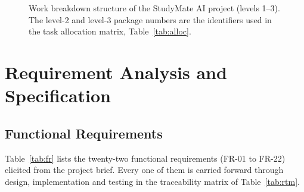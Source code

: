 \documentclass[12pt,a4paper,oneside]{report}
\begin{document}
\begin{landscape}
\begin{figure}[H]
\caption{Work breakdown structure of the StudyMate AI project (levels 1--3). The
level-2 and level-3 package numbers are the identifiers used in the task allocation
matrix, Table~\ref{tab:alloc}.}
\label{fig:wbs}
\end{figure}
\end{landscape}

\chapter{Requirement Analysis and Specification}\label{ch:req}

\section{Functional Requirements}

Table~\ref{tab:fr} lists the twenty-two functional requirements (FR-01 to FR-22) elicited from the project brief. Every one of them is carried forward through design, implementation and testing in the traceability matrix of Table~\ref{tab:rtm}.
\end{document}
